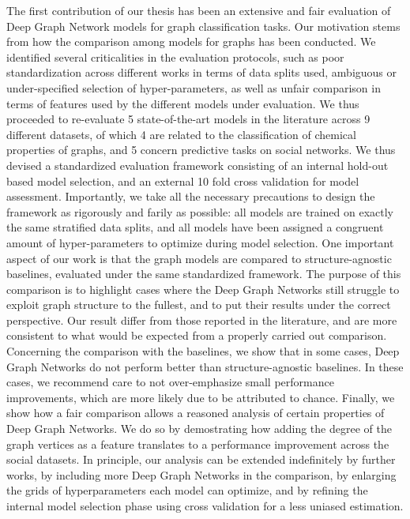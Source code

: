 The first contribution of our thesis has been an extensive and fair evaluation of Deep Graph Network models for graph classification tasks. Our motivation stems from how the comparison among models for graphs has been conducted. We identified several criticalities in the evaluation protocols, such as poor standardization across different works in terms of data splits used, ambiguous or under-specified selection of hyper-parameters, as well as unfair comparison in terms of features used by the different models under evaluation. We thus proceeded to re-evaluate 5 state-of-the-art models in the literature across 9 different datasets, of which 4 are related to the classification of chemical properties of graphs, and 5 concern predictive tasks on social networks. We thus devised a standardized evaluation framework consisting of an internal hold-out based model selection, and an external 10 fold cross validation for model assessment. Importantly, we take all the necessary precautions to design the framework as rigorously and farily as possible: all models are trained on exactly the same stratified data splits, and all models have been assigned a congruent amount of hyper-parameters to optimize during model selection. One important aspect of our work is that the graph models are compared to structure-agnostic baselines, evaluated under the same standardized framework. The purpose of this comparison is to highlight cases where the Deep Graph Networks still struggle to exploit graph structure to the fullest, and to put their results under the correct perspective. Our result differ from those reported in the literature, and are more consistent to what would be expected from a properly carried out comparison. Concerning the comparison with the baselines, we show that in some cases, Deep Graph Networks do not perform better than structure-agnostic baselines. In these cases, we recommend care to not over-emphasize small performance improvements, which are more likely due to be attributed to chance. Finally, we show how a fair comparison allows a reasoned analysis of certain properties of Deep Graph Networks. We do so by demostrating how adding the degree of the graph vertices as a feature translates to a performance improvement across the social datasets. In principle, our analysis can be extended indefinitely by further works, by including more Deep Graph Networks in the comparison, by enlarging the grids of hyperparameters each model can optimize, and by refining the internal model selection phase using cross validation for a less uniased estimation.

